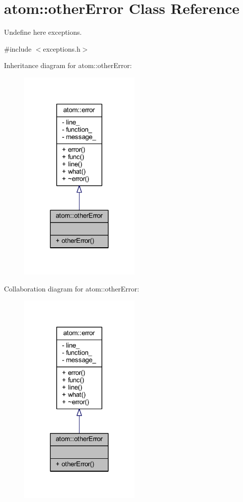 \hypertarget{classatom_1_1other_error}{}\section{atom\+:\+:other\+Error Class Reference}
\label{classatom_1_1other_error}


Undefine here exceptions.  




{\ttfamily \#include $<$exceptions.\+h$>$}



Inheritance diagram for atom\+:\+:other\+Error\+:
\nopagebreak
\begin{figure}[H]
\begin{center}
\leavevmode
\includegraphics[width=167pt]{classatom_1_1other_error__inherit__graph}
\end{center}
\end{figure}


Collaboration diagram for atom\+:\+:other\+Error\+:
\nopagebreak
\begin{figure}[H]
\begin{center}
\leavevmode
\includegraphics[width=167pt]{classatom_1_1other_error__coll__graph}
\end{center}
\end{figure}
